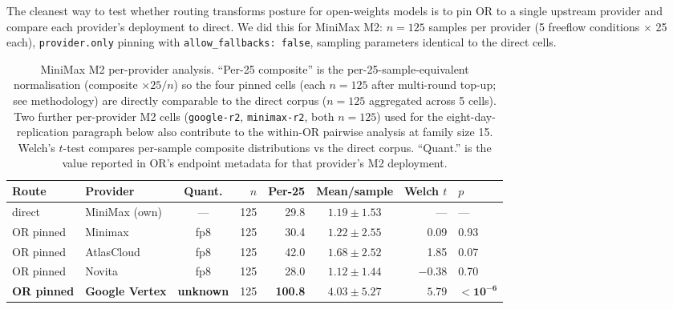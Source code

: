 \documentclass[11pt,a4paper]{article}
\begin{document}
The cleanest way to test whether routing transforms posture for open-weights models is to pin OR to a single upstream provider and compare each provider's deployment to direct. We did this for MiniMax M2: $n{=}125$ samples per provider (5 freeflow conditions $\times$ 25 each), \texttt{provider.only} pinning with \texttt{allow\_fallbacks: false}, sampling parameters identical to the direct cells.

\begin{table}[h]
\centering
\caption{MiniMax M2 per-provider analysis. ``Per-25 composite'' is the per-25-sample-equivalent normalisation (composite $\times 25 / n$) so the four pinned cells (each $n{=}125$ after multi-round top-up; see methodology) are directly comparable to the direct corpus ($n{=}125$ aggregated across 5 cells). Two further per-provider M2 cells (\texttt{google-r2}, \texttt{minimax-r2}, both $n{=}125$) used for the eight-day-replication paragraph below also contribute to the within-OR pairwise analysis at family size 15. Welch's $t$-test compares per-sample composite distributions vs the direct corpus. ``Quant.'' is the value reported in OR's endpoint metadata for that provider's M2 deployment.}
\label{tab:routing-per-provider}
\small
\begin{tabular}{llcrrcrl}
\toprule
\textbf{Route} & \textbf{Provider} & \textbf{Quant.} & \textbf{$n$} & \textbf{Per-25} & \textbf{Mean/sample} & \textbf{Welch $t$} & \textbf{$p$} \\
\midrule
direct & MiniMax (own) & --- & 125 & 29.8 & $1.19 \pm 1.53$ & --- & --- \\
OR pinned & Minimax & fp8 & 125 & 30.4 & $1.22 \pm 2.55$ & 0.09 & 0.93 \\
OR pinned & AtlasCloud & fp8 & 125 & 42.0 & $1.68 \pm 2.52$ & 1.85 & 0.07 \\
OR pinned & Novita & fp8 & 125 & 28.0 & $1.12 \pm 1.44$ & $-0.38$ & 0.70 \\
\textbf{OR pinned} & \textbf{Google Vertex} & \textbf{unknown} & 125 & \textbf{100.8} & $\mathbf{4.03 \pm 5.27}$ & $\mathbf{5.79}$ & $\mathbf{<10^{-6}}$ \\
\bottomrule
\end{tabular}
\end{table}
\end{document}
